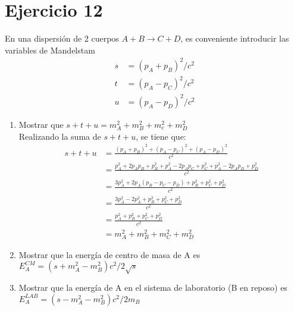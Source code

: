 \section*{Ejercicio 12}
En una dispersión de 2 cuerpos $A+B \rightarrow C+D$, es conveniente introducir las variables de Mandelstam 
\begin{align*}
    s&=(p_A+p_B)^2/c^2 \\
    t&=(p_A-p_C)^2/c^2 \\
    u&= (p_A-p_D)^2/c^2
\end{align*}
\begin{enumerate}
    \item Mostrar que $s+t+u=m_A^2+m_B^2+m_c^2+m_D^2$\\
    Realizando la suma de $s+t+u$, se tiene que:
    \begin{align*}
        s+t+u&= \frac{(p_A+p_B)^2+(p_A-p_C)^2+(p_A-p_D)^2}{c^2}\\
        &=\frac{p_A^2+2p_Ap_B+p_B^2+p_A^2-2p_Ap_C+p_C^2+p_A^2-2p_Ap_D+p_D^2}{c^2}\\
        &=\frac{3p_A^2+2p_A(p_B-p_C-p_D)+p_B^2+p_C^2+p_D^2}{c^2}\\
        &=\frac{3p_A^2-2p_A^2+p_B^2+p_C^2+p_D^2}{c^2}\\
        &=\frac{p_A^2+p_B^2+p_C^2+p_D^2}{c^2}\\
        &=m_A^2+m_B^2+m_C^2+m_D^2
    \end{align*}
    \item Mostrar que la energía de centro de masa de A es $E_A^{CM}=(s+m_A^2-m_B^2)c^2/2\sqrt{s}$
    \item Mostrar que la energía de A en el sistema de laboratorio (B en reposo) es $E_A^{LAB}=(s-m_A^2-m_B^2)c^2/2m_B$
\end{enumerate}